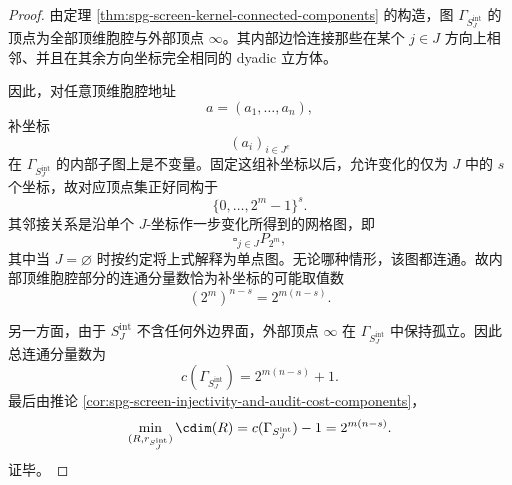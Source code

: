 \begin{proof}
由定理 \ref{thm:spg-screen-kernel-connected-components} 的构造，图 \(\Gamma_{S_J^{\mathrm{int}}}\) 的顶点为全部顶维胞腔与外部顶点 \(\infty\)。其内部边恰连接那些在某个 \(j\in J\) 方向上相邻、并且在其余方向坐标完全相同的 dyadic 立方体。

因此，对任意顶维胞腔地址
\[
a=(a_1,\dots,a_n),
\]
补坐标
\[
(a_i)_{i\in J^c}
\]
在 \(\Gamma_{S_J^{\mathrm{int}}}\) 的内部子图上是不变量。固定这组补坐标以后，允许变化的仅为 \(J\) 中的 \(s\) 个坐标，故对应顶点集正好同构于
\[
\{0,\dots,2^m-1\}^s.
\]
其邻接关系是沿单个 \(J\)-坐标作一步变化所得到的网格图，即
\[
\square_{j\in J} P_{2^m},
\]
其中当 \(J=\varnothing\) 时按约定将上式解释为单点图。无论哪种情形，该图都连通。故内部顶维胞腔部分的连通分量数恰为补坐标的可能取值数
\[
(2^m)^{n-s}=2^{m(n-s)}.
\]

另一方面，由于 \(S_J^{\mathrm{int}}\) 不含任何外边界面，外部顶点 \(\infty\) 在 \(\Gamma_{S_J^{\mathrm{int}}}\) 中保持孤立。因此总连通分量数为
\[
c(\Gamma_{S_J^{\mathrm{int}}})=2^{m(n-s)}+1.
\]
最后由推论 \ref{cor:spg-screen-injectivity-and-audit-cost-components}，
\[
\min_{(R,r_{S_J^{\mathrm{int}}})}\cdim(R)
=
c(\Gamma_{S_J^{\mathrm{int}}})-1
=
2^{m(n-s)}.
\]
证毕。
\end{proof}

